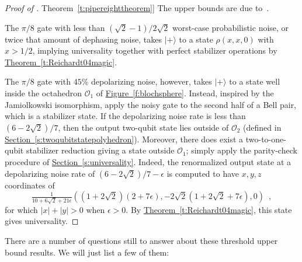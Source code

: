 \documentclass[11pt]{article}
\def\ket #1{\vert #1\rangle}
\def\abs #1{\lvert #1\rvert}
\newcommand{\beq}{\begin{equation}}
\newcommand{\eeq}{\end{equation}}
\theoremstyle{note}
\newcommand{\thmref}[1]{\hyperref[#1]{{Theorem~\ref*{#1}}}}
\newcommand{\secref}[1]{\hyperref[#1]{{Section~\ref*{#1}}}}
\newcommand{\figref}[1]{\hyperref[#1]{{Figure~\ref*{#1}}}}
\begin{document}
\begin{proof}[Proof of \thmref{t:pipereighttheorem}]
The upper bounds are due to~\cite{VirmaniHuelgaPlenio, BuhrmanCleveLaurentLindenSchrijverUnger06}.  

The $\pi/8$ gate with less than $(\sqrt{2}-1)/2\sqrt{2}$ worst-case probabilistic noise, or twice that amount of dephasing noise, takes $\ket{+}$ to a state $\rho(x,x,0)$ with $x > 1/2$, implying universality together with perfect stabilizer operations by \thmref{t:Reichardt04magic}.  

The $\pi/8$ gate with $45\%$ depolarizing noise, however, takes $\ket{+}$ to a state well inside the octahedron $\mathcal O_1$ of \figref{f:blochsphere}.  Instead, inspired by the Jamiolkowski isomorphism, apply the noisy gate to the second half of a Bell pair, which is a stabilizer state.  If the depolarizing noise rate is less than $(6 - 2 \sqrt 2)/7$, then the output two-qubit state lies outside of $\mathcal O_2$ (defined in \secref{s:twoqubitstatepolyhedron}).  Moreover, there does exist a two-to-one-qubit stabilizer reduction giving a state outside $\mathcal O_1$; simply apply the parity-check procedure of \secref{s:universality}.  Indeed, the renormalized output state at a depolarizing noise rate of $(6 - 2 \sqrt 2)/7 - \epsilon$ is computed to have $x, y, z$ coordinates of 
\beq
\tfrac{1}{10 + 6 \sqrt 2 + 21 \epsilon} \left( (1 + 2 \sqrt 2)(2 + 7 \epsilon), -2 \sqrt 2 (1 + 2 \sqrt 2 + 7 \epsilon), 0 \right)
 \enspace ,
\eeq
for which $\abs x +\abs y > 0$ when $\epsilon > 0$.  By \thmref{t:Reichardt04magic}, this state gives universality.  
\end{proof}

There are a number of questions still to answer about these threshold upper bound results.  We will just list a few of them:
\end{document}
